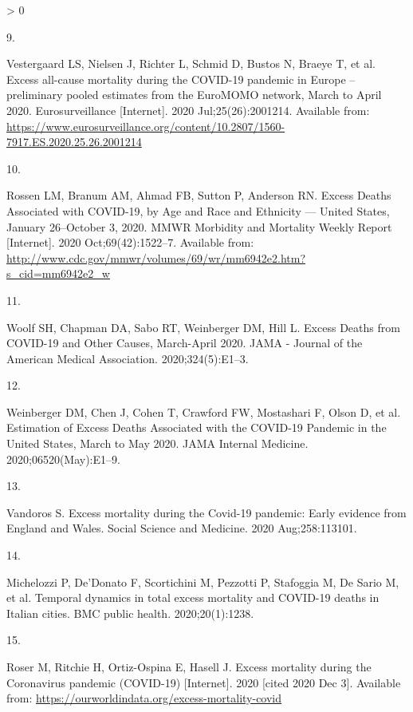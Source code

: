 \documentclass[
]{article}
\newlength{\cslhangindent}
\newlength{\csllabelwidth}
\newenvironment{CSLReferences}[2] %
 {%
  \setlength{\parindent}{0pt}
  \ifodd #1 \everypar{\setlength{\hangindent}{\cslhangindent}}\ignorespaces\fi
  \ifnum #2 > 0
  \setlength{\parskip}{#2\baselineskip}
  \fi
 }%
 {}
\newcommand{\CSLLeftMargin}[1]{\parbox[t]{\csllabelwidth}{#1}}
\newcommand{\CSLRightInline}[1]{\parbox[t]{\linewidth - \csllabelwidth}{#1}\break}
\begin{document}
\begin{CSLReferences}{0}{0}
\leavevmode\hypertarget{ref-Vestegaard2020}{}%
\CSLLeftMargin{9. }
\CSLRightInline{Vestergaard LS, Nielsen J, Richter L, Schmid D, Bustos N, Braeye T, et al. {Excess all-cause mortality during the COVID-19 pandemic in Europe -- preliminary pooled estimates from the EuroMOMO network, March to April 2020}. Eurosurveillance {[}Internet{]}. 2020 Jul;25(26):2001214. Available from: \url{https://www.eurosurveillance.org/content/10.2807/1560-7917.ES.2020.25.26.2001214}}

\leavevmode\hypertarget{ref-Rossen2020}{}%
\CSLLeftMargin{10. }
\CSLRightInline{Rossen LM, Branum AM, Ahmad FB, Sutton P, Anderson RN. {Excess Deaths Associated with COVID-19, by Age and Race and Ethnicity --- United States, January 26--October 3, 2020}. MMWR Morbidity and Mortality Weekly Report {[}Internet{]}. 2020 Oct;69(42):1522--7. Available from: \url{http://www.cdc.gov/mmwr/volumes/69/wr/mm6942e2.htm?s_cid=mm6942e2_w}}

\leavevmode\hypertarget{ref-Woolf2020}{}%
\CSLLeftMargin{11. }
\CSLRightInline{Woolf SH, Chapman DA, Sabo RT, Weinberger DM, Hill L. {Excess Deaths from COVID-19 and Other Causes, March-April 2020}. JAMA - Journal of the American Medical Association. 2020;324(5):E1--3. }

\leavevmode\hypertarget{ref-Weinberger2020}{}%
\CSLLeftMargin{12. }
\CSLRightInline{Weinberger DM, Chen J, Cohen T, Crawford FW, Mostashari F, Olson D, et al. {Estimation of Excess Deaths Associated with the COVID-19 Pandemic in the United States, March to May 2020}. JAMA Internal Medicine. 2020;06520(May):E1--9. }

\leavevmode\hypertarget{ref-Vandoros2020}{}%
\CSLLeftMargin{13. }
\CSLRightInline{Vandoros S. {Excess mortality during the Covid-19 pandemic: Early evidence from England and Wales}. Social Science and Medicine. 2020 Aug;258:113101. }

\leavevmode\hypertarget{ref-Michelozzi2020}{}%
\CSLLeftMargin{14. }
\CSLRightInline{Michelozzi P, De'Donato F, Scortichini M, Pezzotti P, Stafoggia M, De Sario M, et al. {Temporal dynamics in total excess mortality and COVID-19 deaths in Italian cities}. BMC public health. 2020;20(1):1238. }

\leavevmode\hypertarget{ref-Roser2020}{}%
\CSLLeftMargin{15. }
\CSLRightInline{Roser M, Ritchie H, Ortiz-Ospina E, Hasell J. {Excess mortality during the Coronavirus pandemic (COVID-19)} {[}Internet{]}. 2020 {[}cited 2020 Dec 3{]}. Available from: \url{https://ourworldindata.org/excess-mortality-covid}}


\end{CSLReferences}
\end{document}
